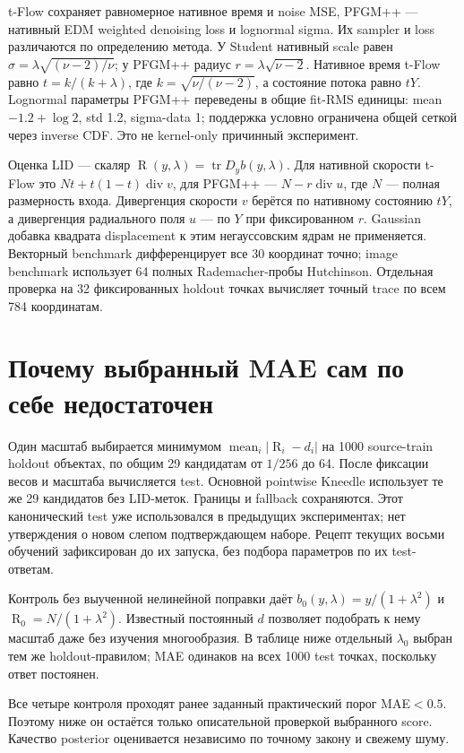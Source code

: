 \documentclass[10pt,a4paper]{article}
\newcommand{\R}{\operatorname{R}}
\begin{document}
t-Flow сохраняет равномерное нативное время и noise MSE, PFGM++ --- нативный
EDM weighted denoising loss и lognormal sigma. Их sampler и loss различаются
по определению метода. У Student нативный scale равен
$\sigma=\lambda\sqrt{(\nu-2)/\nu}$; у PFGM++ радиус
$r=\lambda\sqrt{\nu-2}$. Нативное время t-Flow равно
$t=k/(k+\lambda)$, где $k=\sqrt{\nu/(\nu-2)}$, а состояние потока равно $tY$.
Lognormal параметры PFGM++ переведены в общие
fit-RMS единицы: mean $-1.2+\log2$, std 1.2, sigma-data 1; поддержка условно
ограничена общей сеткой через inverse CDF. Это не kernel-only причинный эксперимент.

Оценка LID --- скаляр $\R(y,\lambda)=\operatorname{tr}D_y b(y,\lambda)$.
Для нативной скорости t-Flow это $Nt+t(1-t)\operatorname{div}v$, для PFGM++ ---
$N-r\operatorname{div}u$, где $N$ --- полная размерность входа.
Дивергенция скорости $v$ берётся по нативному состоянию $tY$, а дивергенция
радиального поля $u$ --- по $Y$ при фиксированном $r$. Gaussian
добавка квадрата displacement к этим негауссовским ядрам не применяется.
Векторный benchmark дифференцирует все 30 координат точно; image benchmark
использует 64 полных Rademacher-пробы Hutchinson. Отдельная проверка на 32
фиксированных holdout точках вычисляет точный trace по всем 784 координатам.

\section*{Почему выбранный MAE сам по себе недостаточен}
Один масштаб выбирается минимумом $\operatorname{mean}_i|\R_i-d_i|$ на 1000
source-train holdout объектах, по общим 29 кандидатам от $1/256$ до 64.
После фиксации весов и масштаба вычисляется test. Основной pointwise Kneedle
использует те же 29 кандидатов без LID-меток. Границы и fallback сохраняются.
Этот канонический test уже использовался в предыдущих экспериментах;
нет утверждения о новом слепом подтверждающем наборе. Рецепт текущих восьми
обучений зафиксирован до их запуска, без подбора параметров по их test-ответам.

Контроль без выученной нелинейной поправки даёт
$b_0(y,\lambda)=y/(1+\lambda^2)$ и $\R_0=N/(1+\lambda^2)$.
Известный постоянный $d$ позволяет подобрать к нему масштаб даже без изучения
многообразия. В таблице ниже отдельный $\lambda_0$ выбран тем же holdout-правилом;
MAE одинаков на всех 1000 test точках, поскольку ответ постоянен.

Все четыре контроля проходят ранее заданный практический порог MAE$<0.5$.
Поэтому ниже он остаётся только описательной проверкой выбранного score.
Качество posterior оценивается независимо по точному закону и свежему шуму.
\end{document}
